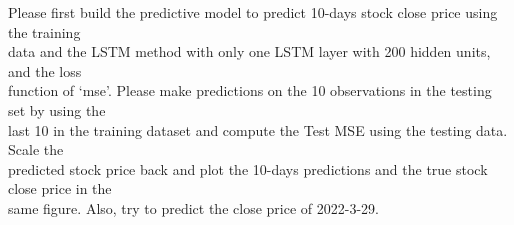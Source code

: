 \documentclass[
]{article}
\newenvironment{Shaded}{\begin{snugshade}}{\end{snugshade}}
\newcommand{\AttributeTok}[1]{\textcolor[rgb]{0.13,0.29,0.53}{#1}}
\newcommand{\FunctionTok}[1]{\textcolor[rgb]{0.13,0.29,0.53}{\textbf{#1}}}
\newcommand{\NormalTok}[1]{#1}
\newcommand{\OtherTok}[1]{\textcolor[rgb]{0.56,0.35,0.01}{#1}}
\newcommand{\SpecialCharTok}[1]{\textcolor[rgb]{0.81,0.36,0.00}{\textbf{#1}}}
\newcommand{\StringTok}[1]{\textcolor[rgb]{0.31,0.60,0.02}{#1}}
\begin{document}
\begin{Shaded}
\end{Shaded}

Please first build the predictive model to predict 10-days stock close
price using the training\\
data and the LSTM method with only one LSTM layer with 200 hidden units,
and the loss\\
function of `mse'. Please make predictions on the 10 observations in the
testing set by using the\\
last 10 in the training dataset and compute the Test MSE using the
testing data. Scale the\\
predicted stock price back and plot the 10-days predictions and the true
stock close price in the\\
same figure. Also, try to predict the close price of 2022-3-29.
\end{document}
